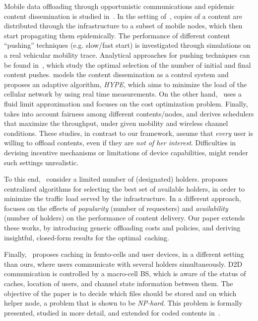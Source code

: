 \documentclass[10pt,conference,letterpaper]{IEEEtran}
\begin{document}
Mobile data offloading through opportunistic communications and epidemic content dissemination is studied in~\cite{offloading-wowmom11,offloading-control-theory,fluid-limit-mass2012,offloading-double-opportunities}. In the setting of~\cite{offloading-wowmom11}, copies of a content are distributed through the infrastructure to a subset of mobile nodes, which then start propagating them epidemically. The performance of different content ``pushing'' techniques (e.g. slow/fast start) is investigated through simulations on a real vehicular mobility trace. Analytical approaches for pushing techniques can be found in~\cite{offloading-control-theory,fluid-limit-mass2012}, which study the optimal selection of the number of initial and final content pushes. \cite{offloading-control-theory} models the content dissemination as a control system and proposes an adaptive algorithm, \textit{HYPE}, which aims to minimize the load of the cellular network by using real time measurements. On the other hand,~\cite{fluid-limit-mass2012} uses a fluid limit approximation and focuses on the cost optimization problem. Finally,~\cite{offloading-double-opportunities} takes into account fairness among different contents/nodes, and derives schedulers that maximize the throughput, under given mobility and wireless channel conditions. These studies, in contrast to our framework, assume that \textit{every} user is willing to offload contents, even if they are \textit{not of her interest}. Difficulties in devising incentive mechanisms or limitations of device capabilities, might render such settings unrealistic.

To this end,~\cite{multiple-offloading,pavlos-not-all-content} consider a limited number of (designated) holders. \cite{multiple-offloading} proposes centralized algorithms for selecting the best set of available holders, in order to minimize the traffic load served by the infrastructure. In a different approach,~\cite{pavlos-not-all-content} focuses on the effects of \textit{popularity} (number of requesters) and \textit{availability} (number of holders) on the performance of content delivery. Our paper extends these works, by introducing generic offloading costs and policies, and deriving insightful, closed-form results for the optimal~caching.

Finally,~\cite{femtocaching-magazine} proposes caching in femto-cells and user devices, in a different setting than ours, where users communicate with several holders simultaneously. D2D communication is controlled by a macro-cell BS, which is aware of the status of caches, location of users, and channel state information between them. The objective of the paper is to decide which files should be stored and on which helper node, a problem that is shown to be \textit{NP-hard}. This problem is formally presented, studied in more detail, and extended for coded contents in~\cite{femtocaching}. 
\end{document}
